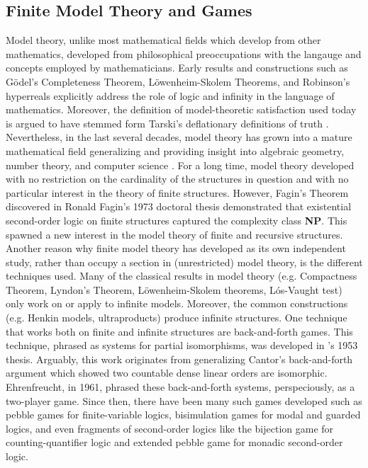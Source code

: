 \subsection{Finite Model Theory and Games}
Model theory, unlike most mathematical fields which develop from other mathematics, developed from philosophical preoccupations with the langauge and concepts employed by mathematicians. Early results and constructions such as G{\"o}del's Completeness Theorem, L{\"o}wenheim-Skolem Theorems, and Robinson's hyperreals explicitly address the role of logic and infinity in the language of mathematics. Moreover, the definition of model-theoretic satisfaction used today is argued to have stemmed form Tarski's deflationary definitions of truth \cite[]{Mancosu2010}. Nevertheless, in the last several decades, model theory has grown into a mature mathematical field generalizing and providing insight into algebraic geometry,  number theory, and computer science . For a long time, model theory developed with no restriction on the cardinality of the structures in question and with no particular interest in the theory of finite structures. However, Fagin's Theorem discovered in Ronald Fagin's 1973 doctoral thesis demonstrated that existential second-order logic on finite structures captured the complexity class \textbf{NP}. This spawned a new interest in the model theory of finite and recursive structures.  Another reason why finite model theory has developed as its own independent study, rather than occupy a section in (unrestricted) model theory, is the different techniques used. Many of the classical results in model theory (e.g. Compactness Theorem, Lyndon's Theorem, L{\"o}wenheim-Skolem theorems, L{\'o}s-Vaught test) only work on or apply to infinite models. Moreover, the common constructions (e.g. Henkin models, ultraproducts) produce infinite structures. One technique that works both on finite and infinite structures are back-and-forth games. This technique, phrased as systems for partial isomorphisms, was developed in {\Fraisse}'s 1953 thesis. Arguably, this work originates from generalizing Cantor's back-and-forth argument which showed two countable dense linear orders are isomorphic. Ehrenfreucht, in 1961, phrased these back-and-forth systems, perspeciously, as a two-player game. Since then, there have been many such games developed such as pebble games \cite{Immerman1982} for finite-variable logics, bisimulation games \cite{Gradel2014} for modal and guarded logics, and even fragments of second-order logics like the bijection game \cite{Hella1996} for counting-quantifier logic and extended pebble game \cite{Libkin2004} for monadic second-order logic.
